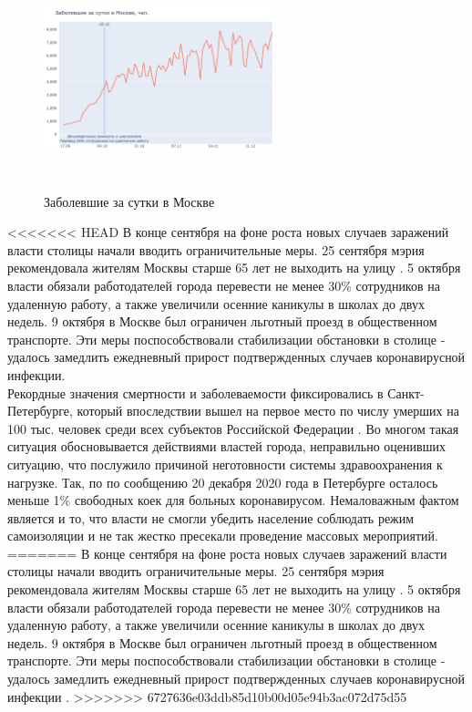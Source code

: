 \documentclass[a4paper, 12pt]{extarticle}
\begin{document}
\begin{figure}
    \centering
    \vspace{-15pt}
    \includegraphics[height=180pt, width=0.6\textwidth]{../plots/7daily_confirmed_with_events_moscow_2.pdf}
    \caption{Заболевшие за сутки в Москве}
    \label{fig:day_confirmed_moscow_with_events}
\end{figure}

<<<<<<< HEAD
В конце сентября на фоне роста новых случаев заражений власти столицы начали
вводить ограничительные меры. 25 сентября мэрия рекомендовала жителям Москвы
старше 65 лет не выходить на улицу . 5
октября власти обязали работодателей города перевести не менее 30\% сотрудников
на удаленную работу, а также увеличили осенние каникулы в школах до двух
недель. 9 октября в Москве был ограничен льготный проезд в общественном
транспорте. Эти меры поспособствовали стабилизации обстановки в столице -
удалось замедлить ежедневный прирост подтвержденных случаев коронавирусной
инфекции.
\\

Рекордные значения смертности и заболеваемости фиксировались в
Санкт-Петербурге, который впоследствии вышел на первое место по числу умерших
на 100 тыс. человек среди всех субъектов Российской Федерации
. Во многом такая ситуация
обосновывается действиями властей города, неправильно оценивших ситуацию, что
послужило причиной неготовности системы здравоохранения к нагрузке. Так, по по
сообщению 20 декабря 2020 года в Петербурге осталось меньше 1\% свободных коек
для больных коронавирусом. Немаловажным фактом является и то, что власти не
смогли убедить население соблюдать режим самоизоляции и не так жестко пресекали
проведение массовых мероприятий.
=======
В конце сентября на фоне роста новых случаев заражений власти столицы начали вводить ограничительные меры. 25 сентября мэрия рекомендовала жителям Москвы старше 65 лет не выходить на улицу . 5 октября власти обязали работодателей города перевести не менее 30\% сотрудников на удаленную работу, а также увеличили осенние каникулы в школах до двух недель. 9 октября в Москве был ограничен льготный проезд в общественном транспорте. Эти меры поспособствовали стабилизации обстановки в столице - удалось замедлить ежедневный прирост подтвержденных случаев коронавирусной инфекции .
>>>>>>> 6727636e03ddb85d10b00d05e94b3ac072d75d55
\\
\end{document}
